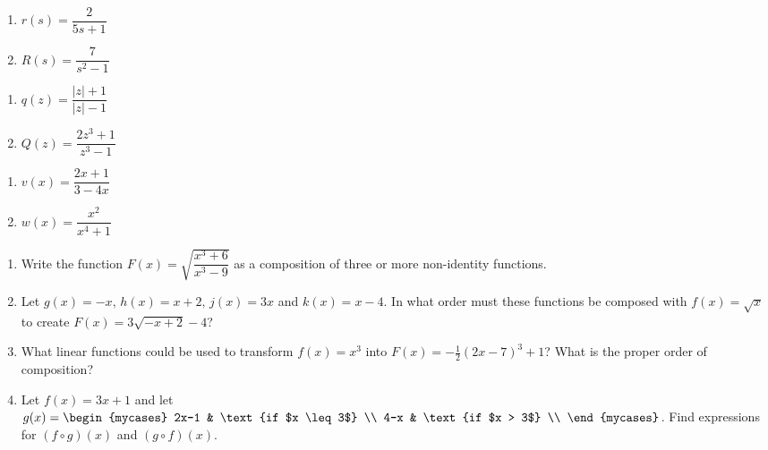 \begin{multicols}{2}
\begin{enumerate}
\setcounter{enumi}{\value{HW}}

\item  $r(s) = \dfrac{2}{5s+1}$
\item  $R(s) = \dfrac{7}{s^2-1}$

\setcounter{HW}{\value{enumi}}
\end{enumerate}
\end{multicols}

\begin{multicols}{2}
\begin{enumerate}
\setcounter{enumi}{\value{HW}}

\item  $q(z) = \dfrac{|z|+1}{|z|-1}$
\item  $Q(z) = \dfrac{2z^3+1}{z^3-1}$

\setcounter{HW}{\value{enumi}}
\end{enumerate}
\end{multicols}

\begin{multicols}{2}
\begin{enumerate}
\setcounter{enumi}{\value{HW}}

\item  $v(x) = \dfrac{2x+1}{3-4x}$
\item  $w(x) = \dfrac{x^2}{x^4+1}$ \label{breakdownxomexlast}

\setcounter{HW}{\value{enumi}}
\end{enumerate}
\end{multicols}

\begin{enumerate}
\setcounter{enumi}{\value{HW}}

\item Write the function $F(x) = \sqrt{\dfrac{x^{3} + 6}{x^{3} - 9}}$ as a composition of three or more non-identity functions.

\item Let $g(x) = -x, \, h(x) = x + 2, \, j(x) = 3x$ and $k(x) = x - 4$.  In what order must these functions be composed with $f(x) = \sqrt{x}$ to create $F(x) = 3\sqrt{-x + 2} - 4$?

\item What linear functions could be used to transform $f(x) = x^{3}$ into $F(x) = -\frac{1}{2}(2x - 7)^{3} + 1$?  What is the proper order of composition?

\item Let $f(x) = 3x+1$ and let $g(x) =    \begin{mycases}  2x-1 &  \text{if $x \leq 3$} \\   4-x & \text{if $x > 3$} \\  \end{mycases}$.  Find expressions for $(f \circ g)(x)$ and $(g \circ f)(x)$.

\setcounter{HW}{\value{enumi}}
\end{enumerate}

